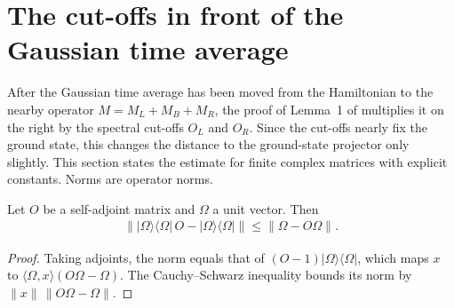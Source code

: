 \section{The cut-offs in front of the Gaussian time average}
\label{sec:hastings_moved_estimate}


After the Gaussian time average has been moved from the Hamiltonian to the
nearby operator $M=M_L+M_B+M_R$, the proof of Lemma~1 of
\cite{Hastings2007AreaLaw} multiplies it on the right by the spectral cut-offs
$O_L$ and $O_R$. Since the cut-offs nearly fix the ground state, this changes
the distance to the ground-state projector only slightly. This section states
the estimate for finite complex matrices with explicit constants. Norms are
operator norms.

\begin{lemma}
    \label{thm:hastings_ground_projector_mul}
    \leanok
    Let $O$ be a self-adjoint matrix and $\Omega$ a unit vector. Then
    \begin{align*}
        \bigl\||\Omega\rangle\langle\Omega|\,O-|\Omega\rangle\langle\Omega|\bigr\|
        \le\|\Omega-O\Omega\|.
    \end{align*}
\end{lemma}
\begin{proof}\leanok
    Taking adjoints, the norm equals that of
    $(O-1)|\Omega\rangle\langle\Omega|$, which maps $x$ to
    $\langle\Omega,x\rangle(O\Omega-\Omega)$. The Cauchy--Schwarz inequality
    bounds its norm by $\|x\|\,\|O\Omega-\Omega\|$.
\end{proof}

